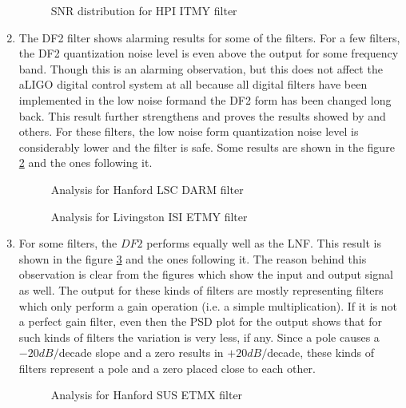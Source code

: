 \documentclass[colorlinks=true,pdfstartview=FitV,linkcolor=blue,
            citecolor=red,urlcolor=magenta]{ligodoc}
\begin{document}
\begin{enumerate}
\begin{figure}[H]
			  \centering
			  \def\svgscale{0.5}
			  \tiny{
			  
			  }
			  \caption{SNR distribution for HPI ITMY filter}
			 \label{good_snr}
		\end{figure}
		\item The DF2 filter shows alarming results for some of the filters. For a few filters, the DF2 quantization noise level is even above the output for some frequency band.  Though this is an alarming observation, but this does not affect the aLIGO digital control system at all because all digital filters have been implemented in the low noise formand the DF2 form has been changed long back. This result further strengthens and proves the results showed by \cite{matts} and others. For these filters, the low noise form quantization noise level is considerably lower and the filter is safe. Some results are shown in the figure \ref{dfbad} and the ones following it.
		\begin{figure}[H]
 
			  \centering
			  \def\svgscale{0.5}
			  \tiny{
			  
			  }
			  \caption{Analysis for Hanford LSC DARM filter}
			 \label{dfbad}
		\end{figure}
		\begin{figure}[H]
 
			  \centering
			  \def\svgscale{0.5}
			  \tiny{
			  
			  }
			  \caption{Analysis for Livingston ISI ETMY filter}
		\end{figure}
		
		\item For some filters, the $DF2$ performs equally well as the LNF. This result is shown in the figure \ref{bqfdf} and the ones following it. The reason behind this observation is clear from the figures which show the input and output signal as well. The output for these kinds of filters are mostly representing filters which only perform a gain operation (i.e. a simple multiplication). If it is not a perfect gain filter, even then the PSD plot for the output shows that for such kinds of filters the variation is very less, if any. Since a pole causes a $-20dB/$decade slope and a zero results in $+20dB/$decade, these kinds of filters represent a pole and a zero placed close to each other. 
		\begin{figure}[htbp]
 
			  \centering
			  \def\svgscale{0.5}
			  \tiny{
			  
			  }
			  \caption{Analysis for Hanford SUS ETMX filter}
			 \label{bqfdf}
		\end{figure}
		\begin{figure}[H]
 

\end{figure}
\end{enumerate}
\end{document}
